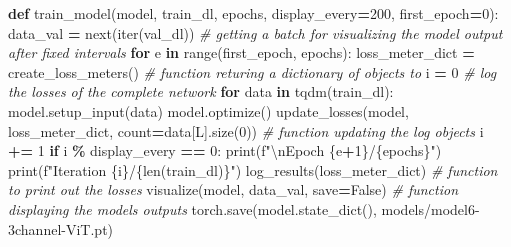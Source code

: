 \documentclass[
]{article}
\newenvironment{Shaded}{\begin{snugshade}}{\end{snugshade}}
\newcommand{\BuiltInTok}[1]{#1}
\newcommand{\CharTok}[1]{\textcolor[rgb]{0.31,0.60,0.02}{#1}}
\newcommand{\CommentTok}[1]{\textcolor[rgb]{0.56,0.35,0.01}{\textit{#1}}}
\newcommand{\ControlFlowTok}[1]{\textcolor[rgb]{0.13,0.29,0.53}{\textbf{#1}}}
\newcommand{\DecValTok}[1]{\textcolor[rgb]{0.00,0.00,0.81}{#1}}
\newcommand{\KeywordTok}[1]{\textcolor[rgb]{0.13,0.29,0.53}{\textbf{#1}}}
\newcommand{\NormalTok}[1]{#1}
\newcommand{\OperatorTok}[1]{\textcolor[rgb]{0.81,0.36,0.00}{\textbf{#1}}}
\newcommand{\SpecialCharTok}[1]{\textcolor[rgb]{0.00,0.00,0.00}{#1}}
\newcommand{\SpecialStringTok}[1]{\textcolor[rgb]{0.31,0.60,0.02}{#1}}
\newcommand{\StringTok}[1]{\textcolor[rgb]{0.31,0.60,0.02}{#1}}
\newcommand{\VariableTok}[1]{\textcolor[rgb]{0.00,0.00,0.00}{#1}}
\begin{document}
\begin{Shaded}
\begin{Highlighting}[]
\KeywordTok{def}\NormalTok{ train\_model(model, train\_dl, epochs, display\_every}\OperatorTok{=}\DecValTok{200}\NormalTok{, first\_epoch}\OperatorTok{=}\DecValTok{0}\NormalTok{):}
\NormalTok{    data\_val }\OperatorTok{=} \BuiltInTok{next}\NormalTok{(}\BuiltInTok{iter}\NormalTok{(val\_dl)) }\CommentTok{\# getting a batch for visualizing the model output after fixed intervals}
    \ControlFlowTok{for}\NormalTok{ e }\KeywordTok{in} \BuiltInTok{range}\NormalTok{(first\_epoch, epochs):}
\NormalTok{        loss\_meter\_dict }\OperatorTok{=}\NormalTok{ create\_loss\_meters() }\CommentTok{\# function returing a dictionary of objects to }
\NormalTok{        i }\OperatorTok{=} \DecValTok{0}                                  \CommentTok{\# log the losses of the complete network}
        \ControlFlowTok{for}\NormalTok{ data }\KeywordTok{in}\NormalTok{ tqdm(train\_dl):}
\NormalTok{            model.setup\_input(data) }
\NormalTok{            model.optimize()}
\NormalTok{            update\_losses(model, loss\_meter\_dict, count}\OperatorTok{=}\NormalTok{data[}\StringTok{\textquotesingle{}L\textquotesingle{}}\NormalTok{].size(}\DecValTok{0}\NormalTok{)) }\CommentTok{\# function updating the log objects}
\NormalTok{            i }\OperatorTok{+=} \DecValTok{1}
            \ControlFlowTok{if}\NormalTok{ i }\OperatorTok{\%}\NormalTok{ display\_every }\OperatorTok{==} \DecValTok{0}\NormalTok{:}
                \BuiltInTok{print}\NormalTok{(}\SpecialStringTok{f"}\CharTok{\textbackslash{}n}\SpecialStringTok{Epoch }\SpecialCharTok{\{}\NormalTok{e}\OperatorTok{+}\DecValTok{1}\SpecialCharTok{\}}\SpecialStringTok{/}\SpecialCharTok{\{}\NormalTok{epochs}\SpecialCharTok{\}}\SpecialStringTok{"}\NormalTok{)}
                \BuiltInTok{print}\NormalTok{(}\SpecialStringTok{f"Iteration }\SpecialCharTok{\{}\NormalTok{i}\SpecialCharTok{\}}\SpecialStringTok{/}\SpecialCharTok{\{}\BuiltInTok{len}\NormalTok{(train\_dl)}\SpecialCharTok{\}}\SpecialStringTok{"}\NormalTok{)}
\NormalTok{                log\_results(loss\_meter\_dict) }\CommentTok{\# function to print out the losses}
\NormalTok{                visualize(model, data\_val, save}\OperatorTok{=}\VariableTok{False}\NormalTok{) }\CommentTok{\# function displaying the model\textquotesingle{}s outputs}
\NormalTok{        torch.save(model.state\_dict(), }\StringTok{\textquotesingle{}models/model6{-}3channel{-}ViT.pt\textquotesingle{}}\NormalTok{)}

\end{Highlighting}
\end{Shaded}
\end{document}
